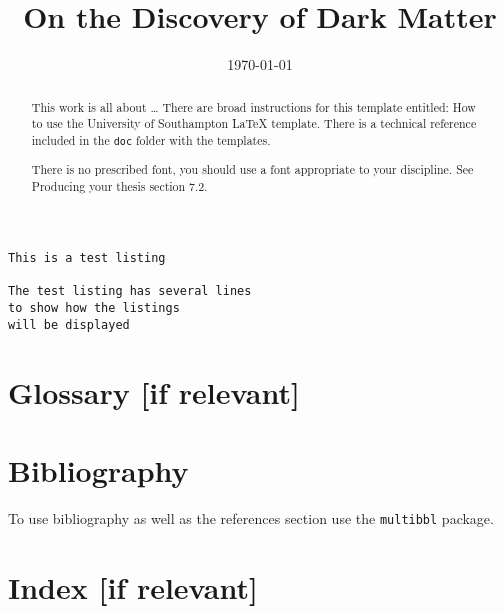 \documentclass[sotoncolour]{uosthesis}      %
\title      {On the Discovery of Dark Matter}
\date       {\today}
\begin{document}
\copyrightDeclaration{} %
\raggedright                  %
\frontmatter
\maketitle
\begin{abstract}
This work is all about \dots
There are broad instructions for this template entitled: How to use the University of Southampton LaTeX template. There is a technical reference included in the \texttt{doc} folder with the templates.

There is no prescribed font, you should use a font appropriate to your discipline.  See Producing your thesis section 7.2.
\end{abstract}
\tableofcontents
\listoffigures
\listoftables
\lstlistoflistings
\listofaddmaterial
{}
\mainmatter


\begin{lstlisting}[caption=Listing of what an example listing would be like]
This is a test listing

The test listing has several lines
to show how the listings
will be displayed
\end{lstlisting}
\appendix

\backmatter
\chapter{Glossary [if relevant]}


\chapter{Bibliography}
To use bibliography as well as the references section use the \texttt{multibbl} package.
\chapter{Index [if relevant]}
\end{document}
